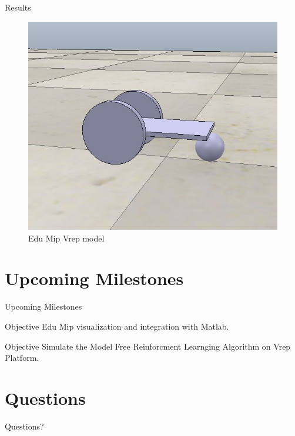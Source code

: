 \documentclass{beamer}
\begin{document}
\begin{frame}{Results}
\begin{figure}
\includegraphics[scale=0.5]{figs/img/vrepEduMip.JPG}
\caption{Edu Mip Vrep model}
\end{figure}
\end{frame}
\section{Upcoming Milestones}
\begin{frame}{Upcoming Milestones}
\begin{block}{Objective}
Edu Mip visualization and integration with Matlab.
\end{block}
\begin{block}{Objective}
Simulate the Model Free Reinforcment Learnging Algorithm on Vrep Platform.
\end{block}
\end{frame}
\section*{Questions}
\begin{frame}
\begin{LARGE}
\begin{center}
Questions?
\end{center}
\end{LARGE}
\end{frame}
\end{document}
